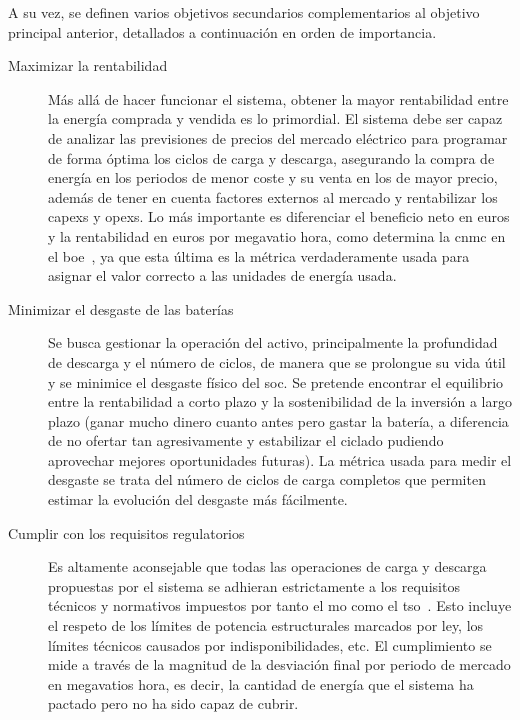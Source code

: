 A su vez, se definen varios objetivos secundarios complementarios al objetivo principal anterior, detallados a continuación en orden de importancia.

\begin{description}

  \item[Maximizar la rentabilidad] Más allá de hacer funcionar el sistema, obtener la mayor rentabilidad entre la energía comprada y vendida es lo primordial. El sistema debe ser capaz de analizar las previsiones de precios del mercado eléctrico para programar de forma óptima los ciclos de carga y descarga, asegurando la compra de energía en los periodos de menor coste y su venta en los de mayor precio, además de tener en cuenta factores externos al mercado y rentabilizar los \glspl{capex} y \glspl{opex}. Lo más importante es diferenciar el beneficio neto en euros y la rentabilidad en euros por megavatio hora, como determina la \gls{cnmc} en el \gls{boe}~\cite{cnmc2025resolucion}, ya que esta última es la métrica verdaderamente usada para asignar el valor correcto a las unidades de energía usada.

  \item[Minimizar el desgaste de las baterías] Se busca gestionar la operación del activo, principalmente la profundidad de descarga y el número de ciclos, de manera que se prolongue su vida útil y se minimice el desgaste físico del \gls{soc}. Se pretende encontrar el equilibrio entre la rentabilidad a corto plazo y la sostenibilidad de la inversión a largo plazo (ganar mucho dinero cuanto antes pero gastar la batería, a diferencia de no ofertar tan agresivamente y estabilizar el ciclado pudiendo aprovechar mejores oportunidades futuras). La métrica usada para medir el desgaste se trata del número de ciclos de carga completos que permiten estimar la evolución del desgaste más fácilmente.

  \item[Cumplir con los requisitos regulatorios] Es altamente aconsejable que todas las operaciones de carga y descarga propuestas por el sistema se adhieran estrictamente a los requisitos técnicos y normativos impuestos por tanto el \gls{mo} como el \gls{tso}~\cite{crespo2004resolucion}. Esto incluye el respeto de los límites de potencia estructurales marcados por ley, los límites técnicos causados por indisponibilidades, etc. El cumplimiento se mide a través de la magnitud de la desviación final por periodo de mercado en megavatios hora, es decir, la cantidad de energía que el sistema ha pactado pero no ha sido capaz de cubrir.


\end{description}
